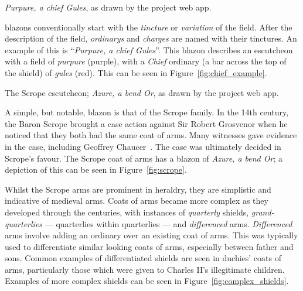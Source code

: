 \documentclass[nobib, a4paper, twoside, justified]{tufte-book}
\makeatletter
\newcommand{\charges}{\glspl{charge}\@\xspace}
\newcommand{\blazon}{\gls{blazon}\@\xspace}
\newcommand{\ublazons}{\Glspl{blazon}\@\xspace}
\makeatother
\begin{document}
\begin{marginfigure}
  \centering
  \def\svgwidth{0.8\linewidth}
  
  \caption{\textit{Purpure, a chief Gules}, as drawn by the project web app.}%
  \label{fig:chief_example}
\end{marginfigure}

\ublazons conventionally start with the \textit{\gls{tincture}} or \textit{\gls{variation}} of the
field. After the description of the field, \textit{\glspl{ordinary}} and \textit{\charges} are
named with their tinctures. An example of this is ``\textit{Purpure, a chief Gules}''. This \blazon
describes an escutcheon with a field of \textit{purpure} (purple), with a \textit{Chief}
\gls{ordinary} (a bar across the top of the shield) of \textit{gules} (red). This can be seen
 in Figure~\ref{fig:chief_example}.

\begin{marginfigure}
  \centering
  \def\svgwidth{0.8\linewidth}
  
  \caption{The Scrope \gls{escutcheon}; \textit{Azure, a bend Or}, as drawn by the project web app.}%
  \label{fig:scrope}
\end{marginfigure}

A simple, but notable, \blazon is that of the Scrope family. In the 14th century, the Baron Scrope
brought a case action against Sir Robert Grosvenor when he noticed that they both had the same coat
of arms. Many witnesses gave evidence in the case, including Geoffrey
Chaucer~\autocite{scrope_grosvenor}. The case was ultimately decided in Scrope's favour. The Scrope
coat of arms has a \blazon of \textit{Azure, a bend Or}; a depiction of this can be seen in
Figure~\ref{fig:scrope}.

Whilst the Scrope arms are prominent in heraldry, they are simplistic and indicative of
medieval arms. Coats of arms became more complex as they developed through the centuries, with
instances of \textit{quarterly} shields, \textit{grand-quarterlies} --- quarterlies within
quarterlies --- and \textit{differenced} arms. \textit{Differenced} arms involve adding an
\gls{ordinary} over an existing coat of arms. This was typically used to differentiate similar
looking coats of arms, especially between father and sons. Common examples of differentiated
shields are seen in duchies' coats of arms, particularly those which were given to Charles II's
illegitimate children. Examples of more complex shields can be seen in
Figure~\ref{fig:complex_shields}.
\end{document}
